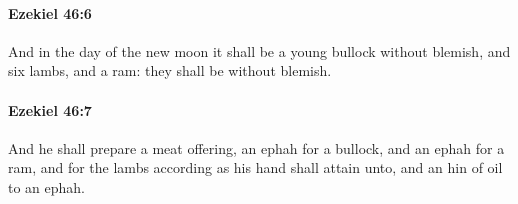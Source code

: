 		\paragraph{Ezekiel 46:6} %
			\label{EZEKIEL-46-6}

			And in the day of the new moon it shall be a young bullock without blemish, and six lambs, and a ram: they shall be without blemish.


		\paragraph{Ezekiel 46:7} %
			\label{EZEKIEL-46-7}

			And he shall prepare a meat offering, an ephah for a bullock, and an ephah for a ram, and for the lambs according as his hand shall attain unto, and an hin of oil to an ephah.


